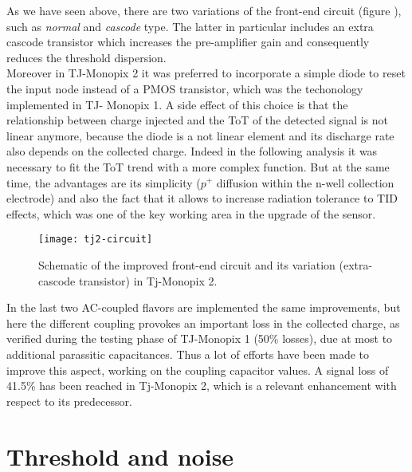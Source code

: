 As we have seen above, there are two variations of the front-end circuit (figure ), such as \textit{normal} and \textit{cascode} type. The latter in particular includes an extra cascode transistor which increases the pre-amplifier gain and consequently reduces the threshold dispersion.\\
Moreover in TJ-Monopix 2 it was preferred to incorporate a simple diode to reset the input node instead of a PMOS transistor, which was the techonology implemented in TJ- Monopix 1. A side effect of this choice is that the relationship between charge injected and the ToT of the detected signal is not linear anymore, because the diode is a not linear element and its discharge rate also depends on the collected charge. Indeed in the following analysis it was necessary to fit the ToT trend with a more complex function. But at the same time, the advantages are its simplicity ($p^{+}$ diffusion within the n-well collection electrode) and also the fact that it allows to increase radiation tolerance to TID effects, which was one of the key working area in the upgrade of the sensor.


\begin{figure}[h!]
\centering
\texttt{[image: tj2-circuit]}
\caption{Schematic of the improved front-end circuit and its variation (extra-cascode transistor) in Tj-Monopix 2.}
\label{fig:tj2_circuit}
\end{figure}


In the last two AC-coupled flavors are implemented the same improvements, but here the different coupling provokes an important loss in the collected charge, as verified during the testing phase of TJ-Monopix 1 (50\% losses), due at most to additional parassitic capacitances. Thus a lot of efforts have been made to improve this aspect, working on the coupling capacitor values. A signal loss of 41.5\% has been reached in Tj-Monopix 2, which is a relevant enhancement with respect to its predecessor.





\section{Threshold and noise} \label{thresh_noise}

